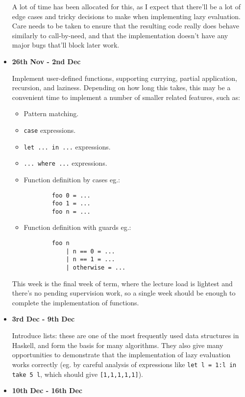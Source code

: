 \documentclass[12pt]{article}
\begin{document}
\begin{itemize}
{    A lot of time has been allocated for this, as I expect that there'll be a lot of edge cases and tricky decisions to
    make when implementing lazy evaluation. Care needs to be taken to ensure that the resulting code really does behave
    similarly to call-by-need, and that the implementation doesn't have any major bugs that'll block later work.
}
\item
{
    \textbf{26th Nov - 2nd Dec}

    Implement user-defined functions, supporting currying, partial application, recursion, and laziness. Depending on
    how long this takes, this may be a convenient time to implement a number of smaller related features, such as:
    
    \begin{itemize}
    \item Pattern matching.
    \item \texttt{case} expressions.
    \item \texttt{let ... in ...} expressions.
    \item \texttt{... where ...} expressions.
    \item
    {
        Function definition by cases eg.:
        \begin{verbatim}
        foo 0 = ...
        foo 1 = ...
        foo n = ...
        \end{verbatim}
    }
    \item
    {
        Function definition with guards eg.:
        \begin{verbatim}
        foo n
            | n == 0 = ...
            | n == 1 = ...
            | otherwise = ...
        \end{verbatim}
    }
    \end{itemize}

    This week is the final week of term, where the lecture load is lightest and there's no pending supervision work, so
    a single week should be enough to complete the implementation of functions.
}
\item
{
    \textbf{3rd Dec - 9th Dec}

    Introduce lists: these are one of the most frequently used data structures in Haskell, and form the basis for many
    algorithms. They also give many opportunities to demonstrate that the implementation of lazy evaluation works
    correctly (eg. by careful analysis of expressions like \texttt{let l = 1:l in take 5 l}, which should
    give \texttt{[1,1,1,1,1]}).
}
\item
{
    \textbf{10th Dec - 16th Dec}

}
\end{itemize}
\end{document}
